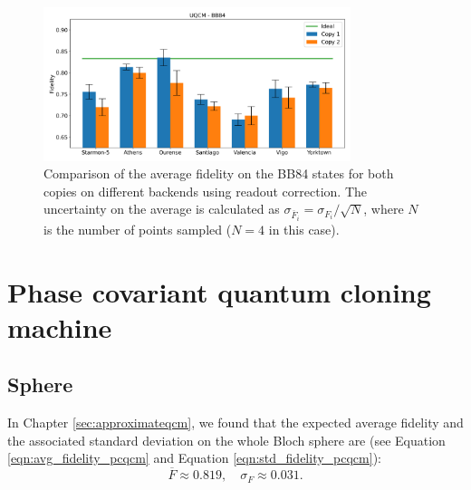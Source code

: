 \begin{figure}[H]
  \centering
          \includegraphics[width=0.8\textwidth]{Figures/UQCM/Histograms/histo_bb84.png}
      
      \caption{Comparison of the average fidelity on the BB84 states for both copies on different backends using readout correction. The uncertainty on the average is calculated as $\sigma_{\overline{F}_i}=\sigma_{F_i}/\sqrt{N}$, where $N$ is the number of points sampled ($N=4$ in this case).}\label{fig:hist_uqcm_bb84_non}
\end{figure}


\section{Phase covariant quantum cloning machine}
\subsection{Sphere}
In Chapter \ref{sec:approximateqcm}, we found that the expected average fidelity and the associated standard deviation on the whole Bloch sphere are (see Equation \ref{eqn:avg_fidelity_pcqcm} and Equation \ref{eqn:std_fidelity_pcqcm}):
\[
  \overline{F}\approx0.819, \quad \sigma_{F}\approx0.031.
\]

